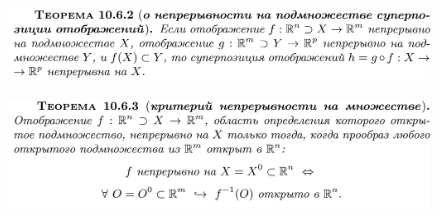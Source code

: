 \documentclass{article}
\begin{document}
\begin{figure}[h!]
    \centering
    \includegraphics[width=\textwidth]{31.png}
    \vspace{-1cm}
\end{figure}
\begin{figure}[h!]
    \centering
    \includegraphics[width=\textwidth]{32.png}
    \vspace{-1cm}
\end{figure}
\end{document}
